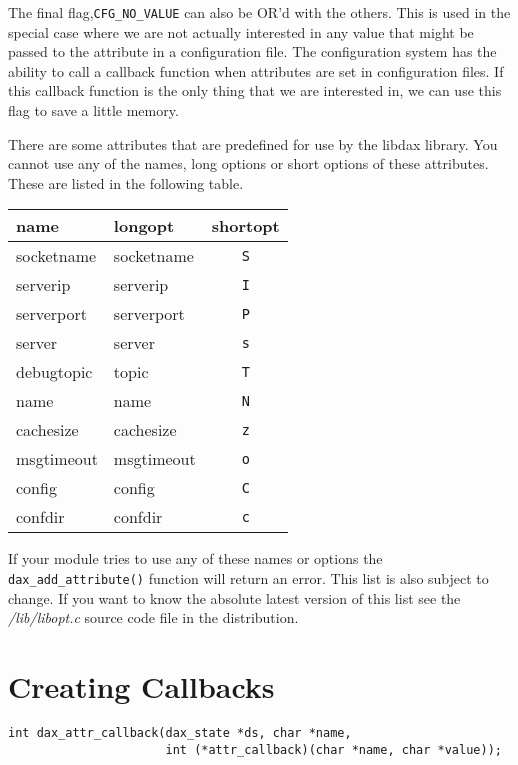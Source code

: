 The final flag,\verb|CFG_NO_VALUE| can also be OR'd with the others.  This is used in the special case where we are not actually interested in any value that might be passed to the attribute in a configuration file.  The configuration system has the ability to call a callback function when attributes are set in configuration files.  If this callback function is the only thing that we are interested in, we can use this flag to save a little memory.

There are some attributes that are predefined for use by the libdax library.  You cannot use any of the names, long options or short options of these attributes.  These are listed in the following table.

\begin{tabular}{|l|l|c|}
\hline \textbf{name} & \textbf{longopt} & \textbf{shortopt} \\
\hline socketname & socketname & \texttt{S} \\
\hline serverip & serverip & \texttt{I} \\
\hline serverport & serverport & \texttt{P} \\
\hline server & server & \texttt{s} \\
\hline debugtopic & topic & \texttt{T} \\
\hline name & name & \texttt{N} \\
\hline cachesize & cachesize & \texttt{z} \\
\hline msgtimeout & msgtimeout & \texttt{o} \\
\hline config\footnotemark & config & \texttt{C} \\
\hline confdir\footnotemark[\value{footnote}] & confdir & \texttt{c} \\
\hline 
\end{tabular} 

If your module tries to use any of these names or options the \verb|dax_add_attribute()| function will return an error.  This list is also subject to change.  If you want to know the absolute latest version of this list see the \textit{/lib/libopt.c} source code file in the \opendax distribution.

\section{Creating Callbacks}
\begin{verbatim}
int dax_attr_callback(dax_state *ds, char *name,
                      int (*attr_callback)(char *name, char *value));
\end{verbatim}


